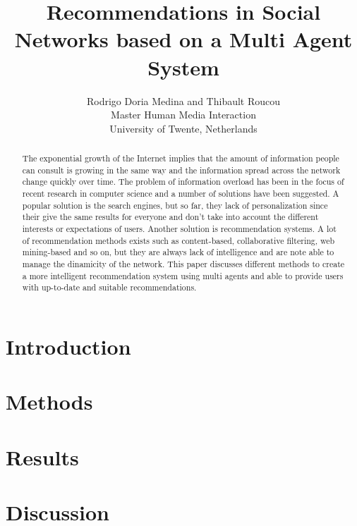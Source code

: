 \documentclass[10pt, a4paper]{article}
\title{Recommendations in Social Networks based on a Multi Agent System}           %
\author{Rodrigo Doria Medina and Thibault Roucou \\ Master Human Media Interaction \\ University of Twente, Netherlands}
\begin{document}
\maketitle                  %
                              
\begin{abstract}

The exponential growth of the Internet implies that the amount of information people can consult is growing in the same way and the information spread across the network change quickly over time. The problem of information overload has been in the focus of recent research in computer science and a number of solutions have been suggested. A popular solution is the search engines, but so far, they lack of personalization since their give the same results for everyone and don't take into account the different interests or expectations of users. Another solution is recommendation systems. A lot of recommendation methods exists such as content-based, collaborative filtering, web mining-based and so on, but they are always lack of intelligence and are note able to manage the dinamicity of the network. This paper discusses different methods to create a more intelligent recommendation system using multi agents and able to provide users with up-to-date and suitable recommendations.

\end{abstract}	

\section{Introduction}

\section{Methods}

\section{Results}

\section{Discussion}
\end{document}
